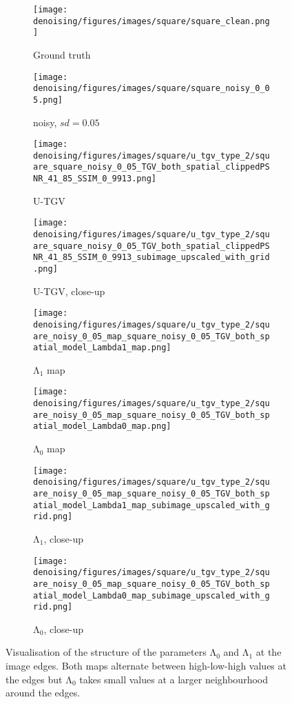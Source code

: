 
\begin{figure}[!t]
    \centering
    \begin{subfigure}[t]{0.24\textwidth}
        \texttt{[image: denoising/figures/images/square/square\_clean.png]}
 \caption{Ground truth}
    \end{subfigure}
    \hfill
    \begin{subfigure}[t]{0.24\textwidth}
        \texttt{[image: denoising/figures/images/square/square\_noisy\_0\_05.png]}
 \caption{noisy, $sd=0.05$}
    \end{subfigure}
    \hfill
    \begin{subfigure}[t]{0.24\textwidth}
        \texttt{[image: denoising/figures/images/square/u\_tgv\_type\_2/square\_square\_noisy\_0\_05\_TGV\_both\_spatial\_clippedPSNR\_41\_85\_SSIM\_0\_9913.png]}
\caption{U-TGV}
    \end{subfigure}
    \hfill
    \begin{subfigure}[t]{0.24\textwidth}
        \texttt{[image: denoising/figures/images/square/u\_tgv\_type\_2/square\_square\_noisy\_0\_05\_TGV\_both\_spatial\_clippedPSNR\_41\_85\_SSIM\_0\_9913\_subimage\_upscaled\_with\_grid.png]}
        \caption{U-TGV, close-up}
    \end{subfigure}
  
    \begin{subfigure}[t]{0.24\textwidth}
        \texttt{[image: denoising/figures/images/square/u\_tgv\_type\_2/square\_noisy\_0\_05\_map\_square\_noisy\_0\_05\_TGV\_both\_spatial\_model\_Lambda1\_map.png]}
       \caption{$\mathrm{\Lambda}_1$ map}
    \end{subfigure}
    \hfill
    \begin{subfigure}[t]{0.24\textwidth}
        \texttt{[image: denoising/figures/images/square/u\_tgv\_type\_2/square\_noisy\_0\_05\_map\_square\_noisy\_0\_05\_TGV\_both\_spatial\_model\_Lambda0\_map.png]}
        \caption{$\mathrm{\Lambda}_0$ map}
    \end{subfigure}
    \hfill
    \begin{subfigure}[t]{0.24\textwidth}
        \texttt{[image: denoising/figures/images/square/u\_tgv\_type\_2/square\_noisy\_0\_05\_map\_square\_noisy\_0\_05\_TGV\_both\_spatial\_model\_Lambda1\_map\_subimage\_upscaled\_with\_grid.png]}
        \caption{$\mathrm{\Lambda}_1$, close-up }
    \end{subfigure}
    \hfill
    \begin{subfigure}[t]{0.24\textwidth}
        \texttt{[image: denoising/figures/images/square/u\_tgv\_type\_2/square\_noisy\_0\_05\_map\_square\_noisy\_0\_05\_TGV\_both\_spatial\_model\_Lambda0\_map\_subimage\_upscaled\_with\_grid.png]}
        \caption{$\mathrm{\Lambda}_0$, close-up}
    \end{subfigure}

    \caption{Visualisation of the structure of the parameters $\mathrm{\Lambda}_0$ and $\mathrm{\Lambda}_1$ at the image edges. Both maps alternate between high-low-high values at the edges but $\mathrm{\Lambda}_0$ takes small values at a larger neighbourhood around the edges.
    }
    \label{fig:synthetic_square_triple_edge}
\end{figure}
